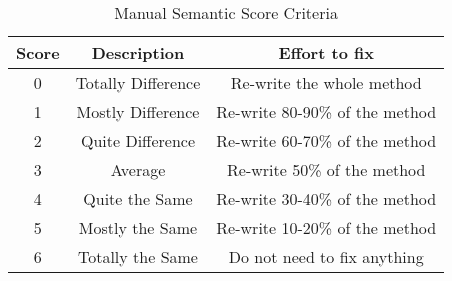 \begin{table}
\begin{tabular}{|c | c | c |}
\hline
Score & Description & Effort to fix \\
\hline
0 & Totally Difference & Re-write the whole method \\
1 & Mostly Difference & Re-write 80-90\% of the method \\
2 & Quite Difference & Re-write 60-70\% of the method \\
3 & Average & Re-write 50\% of the method \\
4 & Quite the Same & Re-write 30-40\% of the method \\
5 & Mostly the Same & Re-write 10-20\% of the method \\
6 & Totally the Same & Do not need to fix anything \\
\hline
\end{tabular}
\caption{Manual Semantic Score Criteria}
\label{table:criteria}
\end{table}